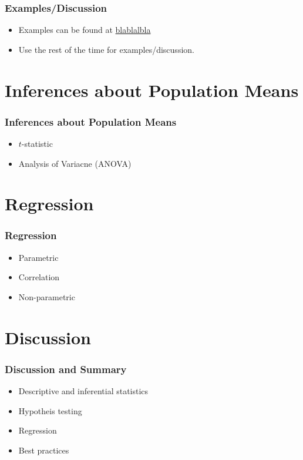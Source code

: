 \documentclass[10pt, compress]{beamer}
\begin{document}
\begin{frame}
    \frametitle{Examples/Discussion}
    \begin{itemize}
        \item Examples can be found at \url{blablalbla}
        \item Use the rest of the time for examples/discussion.
    \end{itemize}
\end{frame}

\section{Inferences about Population Means}

\begin{frame}
    \frametitle{Inferences about Population Means}
    \begin{itemize}
        \item $t$-statistic
        \item Analysis of Variacne (ANOVA)
    \end{itemize}
\end{frame}

\section{Regression}

\begin{frame}
    \frametitle{Regression}
    \begin{itemize}
        \item Parametric
        \item Correlation
        \item Non-parametric
    \end{itemize}
\end{frame}

\section{Discussion}

\begin{frame}
    \frametitle{Discussion and Summary}
    \begin{itemize}
        \item Descriptive and inferential statistics
        \item Hypotheis testing
        \item Regression
        \item Best practices
    \end{itemize}
\end{frame}
\end{document}
